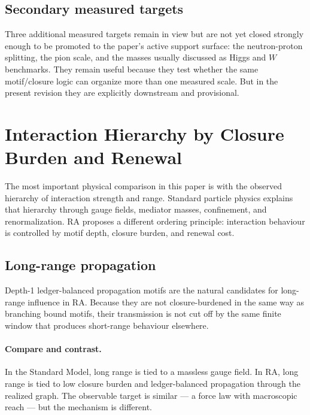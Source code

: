 \documentclass[11pt]{article}
\begin{document}
\subsection{Secondary measured targets}

Three additional measured targets remain in view but are not yet closed strongly enough to be promoted to the paper's active support surface: the neutron-proton splitting, the pion scale, and the masses usually discussed as Higgs and $W$ benchmarks. They remain useful because they test whether the same motif/closure logic can organize more than one measured scale. But in the present revision they are explicitly downstream and provisional.

\section{Interaction Hierarchy by Closure Burden and Renewal}

The most important physical comparison in this paper is with the observed hierarchy of interaction strength and range. Standard particle physics explains that hierarchy through gauge fields, mediator masses, confinement, and renormalization. RA proposes a different ordering principle: interaction behaviour is controlled by motif depth, closure burden, and renewal cost.

\subsection{Long-range propagation}

Depth-1 ledger-balanced propagation motifs are the natural candidates for long-range influence in RA. Because they are not closure-burdened in the same way as branching bound motifs, their transmission is not cut off by the same finite window that produces short-range behaviour elsewhere.

\paragraph{Compare and contrast.} In the Standard Model, long range is tied to a massless gauge field. In RA, long range is tied to low closure burden and ledger-balanced propagation through the realized graph. The observable target is similar --- a force law with macroscopic reach --- but the mechanism is different.
\end{document}
